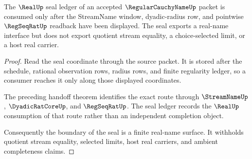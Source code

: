 \begin{theorem}
\label{thm:regularcauchyname-realup-seal-boundary}
The $\RealUp$ seal ledger of an accepted $\RegularCauchyNameUp$ packet is consumed only after the StreamName window, dyadic-radius row, and pointwise $\RegSeqRatUp$ readback have been displayed. The seal exports a real-name interface but does not export quotient stream equality, a choice-selected limit, or a host real carrier.
\end{theorem}
\begin{proof}
Read the seal coordinate through the source packet. It is stored after the schedule, rational observation rows, radius rows, and finite regularity ledger, so a consumer reaches it only along those displayed coordinates.

The preceding handoff theorem identifies the exact route through $\StreamNameUp$, $\DyadicRatCoreUp$, and $\RegSeqRatUp$. The seal ledger records the $\RealUp$ consumption of that route rather than an independent completion object.

Consequently the boundary of the seal is a finite real-name surface. It withholds quotient stream equality, selected limits, host real carriers, and ambient completeness claims.
\end{proof}

